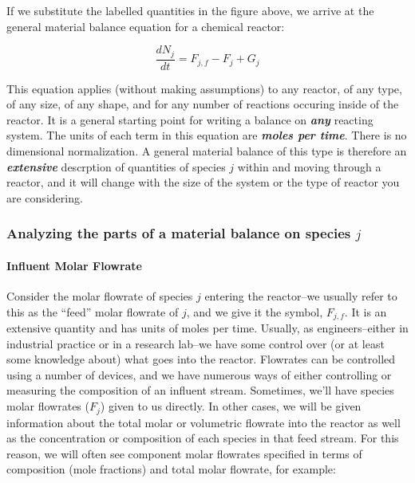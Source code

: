 \documentclass[11pt]{article}
\begin{document}
If we substitute the labelled quantities in the figure above, we arrive
at the general material balance equation for a chemical reactor:

\[\frac{dN_j}{dt} = F_{j,f} - F_j + G_j\]

This equation applies (without making assumptions) to any reactor, of
any type, of any size, of any shape, and for any number of reactions
occuring inside of the reactor. It is a general starting point for
writing a balance on \textbf{\emph{any}} reacting system. The units of
each term in this equation are \textbf{\emph{moles per time}}. There is
no dimensional normalization. A general material balance of this type is
therefore an \textbf{\emph{extensive}} descrption of quantities of
species \(j\) within and moving through a reactor, and it will change
with the size of the system or the type of reactor you are considering.

\hypertarget{analyzing-the-parts-of-a-material-balance-on-species-j}{%
\subsubsection{\texorpdfstring{Analyzing the parts of a material balance
on species
\(j\)}{Analyzing the parts of a material balance on species j}}\label{analyzing-the-parts-of-a-material-balance-on-species-j}}

\hypertarget{influent-molar-flowrate}{%
\paragraph{Influent Molar Flowrate}\label{influent-molar-flowrate}}

Consider the molar flowrate of species \(j\) entering the reactor--we
usually refer to this as the ``feed'' molar flowrate of \(j\), and we
give it the symbol, \(F_{j,f}\). It is an extensive quantity and has
units of moles per time. Usually, as engineers--either in industrial
practice or in a research lab--we have some control over (or at least
some knowledge about) what goes into the reactor. Flowrates can be
controlled using a number of devices, and we have numerous ways of
either controlling or measuring the composition of an influent stream.
Sometimes, we'll have species molar flowrates (\(F_j\)) given to us
directly. In other cases, we will be given information about the total
molar or volumetric flowrate into the reactor as well as the
concentration or composition of each species in that feed stream. For
this reason, we will often see component molar flowrates specified in
terms of composition (mole fractions) and total molar flowrate, for
example:
\end{document}
